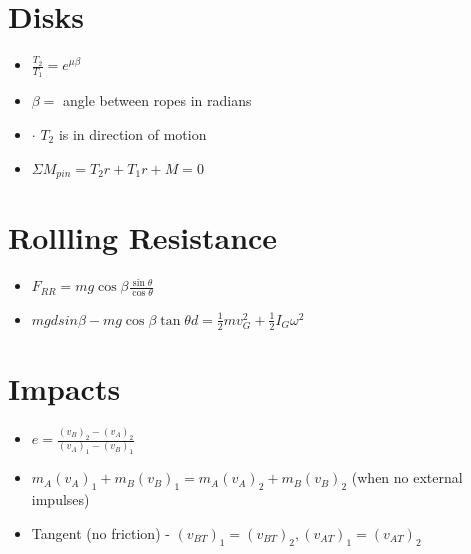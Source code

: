 \documentclass [10pt] {article}
\begin{document}
\begin{multicols*}{2}
\section{Disks}
	\begin{itemize}
		\item $\frac{T_2}{T_1} = e^{\mu\beta} $
		\item $\beta = $ angle between ropes in radians 
		\item $\cdot$ $T_2$ is in direction of motion 
		\item $\Sigma M_{pin} = T_2r + T_1r + M = 0$ 
	\end{itemize}
\section{Rollling Resistance}
	\begin{itemize}
		\item $F_{RR} = mg\cos{\beta}\frac{\sin\theta}{\cos\theta} $
		\item $mgdsin\beta - mg\cos\beta\tan\theta d = \frac{1}{2}mv_G^2 + \frac{1}{2}I_G\omega^2 $
	\end{itemize}
\section{Impacts}
	\begin{itemize}
		\item $e = \frac{(v_B)_2 - (v_A)_2}{(v_A)_1 - (v_B)_1} $
		\item $m_A(v_A)_1 + m_B(v_B)_1 = m_A(v_A)_2 + m_B(v_B)_2$  (when no external impulses)
		\item Tangent (no friction) - $(v_{BT})_1 = (v_{BT})_2, (v_{AT})_1 = (v_{AT})_2$ 
	\end{itemize}
\newpage

\end{multicols*}
\end{document}
